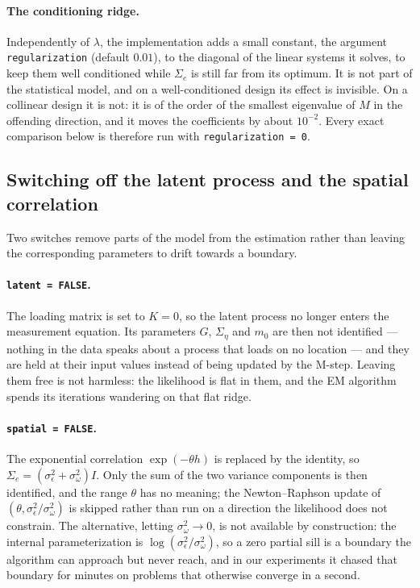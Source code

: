 \documentclass[11pt]{article}
\begin{document}
\paragraph{The conditioning ridge.} Independently of $\lambda$, the implementation adds a small constant, the argument \texttt{regularization} (default $0.01$), to the diagonal of the linear systems it solves, to keep them well conditioned while $\Sigma_e$ is still far from its optimum. It is not part of the statistical model, and on a well-conditioned design its effect is invisible. On a collinear design it is not: it is of the order of the smallest eigenvalue of $M$ in the offending direction, and it moves the coefficients by about $10^{-2}$. Every exact comparison below is therefore run with \texttt{regularization = 0}.

\subsection{Switching off the latent process and the spatial correlation}

Two switches remove parts of the model from the estimation rather than leaving the corresponding parameters to drift towards a boundary.

\paragraph{\texttt{latent = FALSE}.} The loading matrix is set to $K = 0$, so the latent process no longer enters the measurement equation. Its parameters $G$, $\Sigma_\eta$ and $m_0$ are then not identified --- nothing in the data speaks about a process that loads on no location --- and they are held at their input values instead of being updated by the M-step. Leaving them free is not harmless: the likelihood is flat in them, and the EM algorithm spends its iterations wandering on that flat ridge.

\paragraph{\texttt{spatial = FALSE}.} The exponential correlation $\exp(-\theta h)$ is replaced by the identity, so $\Sigma_e = (\sigma^2_\epsilon + \sigma^2_\omega) I$. Only the sum of the two variance components is then identified, and the range $\theta$ has no meaning; the Newton--Raphson update of $(\theta, \sigma^2_\epsilon/\sigma^2_\omega)$ is skipped rather than run on a direction the likelihood does not constrain. The alternative, letting $\sigma^2_\omega \to 0$, is not available by construction: the internal parameterization is $\log(\sigma^2_\epsilon/\sigma^2_\omega)$, so a zero partial sill is a boundary the algorithm can approach but never reach, and in our experiments it chased that boundary for minutes on problems that otherwise converge in a second.
\end{document}
